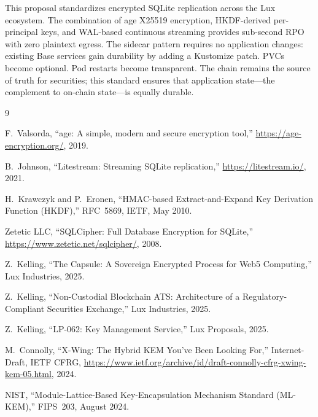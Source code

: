 \documentclass[11pt,a4paper]{article}
\begin{document}
This proposal standardizes encrypted SQLite replication across the
Lux ecosystem. The combination of age X25519 encryption,
HKDF-derived per-principal keys, and WAL-based continuous streaming
provides sub-second RPO with zero plaintext egress. The sidecar
pattern requires no application changes: existing Base services gain
durability by adding a Kustomize patch. PVCs become optional. Pod
restarts become transparent. The chain remains the source of truth
for securities; this standard ensures that application state---the
complement to on-chain state---is equally durable.

\begin{thebibliography}{9}

F.~Valsorda, ``age: A simple, modern and secure encryption tool,''
\url{https://age-encryption.org/}, 2019.

B.~Johnson, ``Litestream: Streaming SQLite replication,''
\url{https://litestream.io/}, 2021.

H.~Krawczyk and P.~Eronen, ``HMAC-based Extract-and-Expand Key
Derivation Function (HKDF),'' RFC~5869, IETF, May 2010.

Zetetic LLC, ``SQLCipher: Full Database Encryption for SQLite,''
\url{https://www.zetetic.net/sqlcipher/}, 2008.

Z.~Kelling, ``The Capsule: A Sovereign Encrypted Process for Web5
Computing,'' Lux Industries, 2025.

Z.~Kelling, ``Non-Custodial Blockchain ATS: Architecture of a
Regulatory-Compliant Securities Exchange,'' Lux Industries, 2025.

Z.~Kelling, ``LP-062: Key Management Service,'' Lux Proposals, 2025.

M.~Connolly, ``X-Wing: The Hybrid KEM You've Been Looking For,''
Internet-Draft, IETF CFRG,
\url{https://www.ietf.org/archive/id/draft-connolly-cfrg-xwing-kem-05.html},
2024.

NIST, ``Module-Lattice-Based Key-Encapsulation Mechanism Standard
(ML-KEM),'' FIPS~203, August 2024.

\end{thebibliography}
\end{document}
